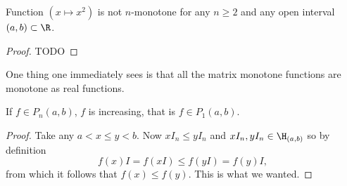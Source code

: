 \begin{prop}
	Function $(x \mapsto x^2)$ is not $n$-monotone for any $n \geq 2$ and any open interval $(a, b) \subset \R$.
\end{prop}
\begin{proof}
	TODO
\end{proof}

One thing one immediately sees is that all the matrix monotone functions are monotone as real functions.

\begin{prop}
	If $f \in P_{n}(a, b)$, $f$ is increasing, that is $f \in P_{1}(a, b)$.
\end{prop}
\begin{proof}
	Take any $a < x \leq y < b$. Now $x I_{n} \leq y I_{n}$ and $xI_{n}, yI_{n} \in \H_{(a, b)}$ so by definition
	\[
		f(x) I = f(xI) \leq f(y I) = f(y) I,
	\]
	from which it follows that $f(x) \leq f(y)$. This is what we wanted.
\end{proof}